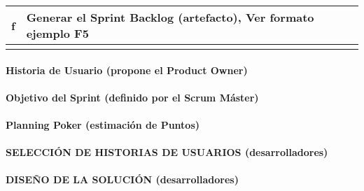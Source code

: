 \begin{doublespace}
\begin{longtable}{|c|p{15cm}|}
\hline
\rowcolor{lightblue} f & Generar el Sprint Backlog (artefacto), Ver formato ejemplo F5 \\
\hline
\rowcolor{bleudefrance} \multicolumn{2}{c|}{} \\
\hline

\end{longtable}

\clearpage  %

\paragraph{\Large\textbf {Historia de Usuario (propone el Product Owner)}}


\clearpage  %
\paragraph{\Large\textbf {Objetivo del Sprint (definido por el Scrum Máster)}}


\paragraph{\Large\textbf {Planning Poker (estimación de Puntos)}}


\clearpage  %
\paragraph{\large\textbf {SELECCIÓN DE HISTORIAS DE USUARIOS (desarrolladores)}}


\clearpage  %
\paragraph{\Large\textbf {DISEÑO DE LA SOLUCIÓN (desarrolladores)}}







\end{doublespace}

